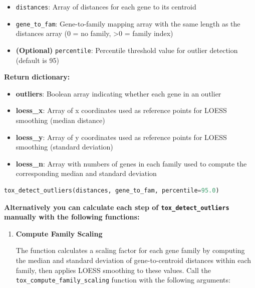 \documentclass[11pt]{article}
\begin{document}
\begin{enumerate}
	      \begin{itemize}
	      	\item \texttt{distances}: Array of distances for each gene to its centroid
	      	      
	      	\item \texttt{gene\_to\_fam}: Gene-to-family mapping array with the same
	      	      length as the distances array (0 = no family, \textgreater 0 = family index)
	      	      
	      	\item \textbf{(Optional)} \texttt{percentile}: Percentile threshold
	      	      value for outlier detection (default is 95)
	      \end{itemize}
	      
	      \textbf{Return dictionary:}
	      \begin{itemize}
	      	\item \textbf{outliers}: Boolean array indicating whether each gene in an
	      	      outlier
	      	      
	      	\item \textbf{loess\_x}: Array of x coordinates used as reference points
	      	      for LOESS smoothing (median distance)
	      	      
	      	\item \textbf{loess\_y}: Array of y coordinates used as reference points
	      	      for LOESS smoothing (standard deviation)
	      	      
	      	\item \textbf{loess\_n}: Array with numbers of genes in each family used
	      	      to compute the corresponding median and standard deviation
	      \end{itemize}
	      
	      \begin{lstlisting}[language=Python, caption={Python Gene Outlier Calculation}]
tox_detect_outliers(distances, gene_to_fam, percentile=95.0)
	      \end{lstlisting}
	      
	      \textbf{Alternatively you can calculate each step of \texttt{tox\_detect\_outliers}
	      manually with the following functions:}
	      \begin{enumerate}
	      	\item \textbf{Compute Family Scaling}
	      	      
	      	      The function calculates a scaling factor for each gene family by computing
	      	      the median and standard deviation of gene-to-centroid distances within
	      	      each family, then applies LOESS smoothing to these values. Call the \texttt{tox\_compute\_family\_scaling}
	      	      function with the following arguments:
	      	      

\end{enumerate}
\end{enumerate}
\end{document}
